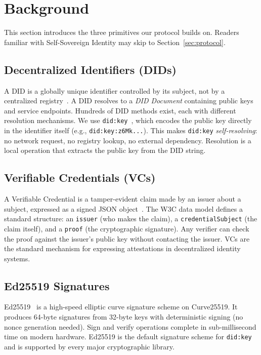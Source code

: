 \documentclass[11pt]{article}
\newcommand{\didkey}{\texttt{did:key}}
\newcommand{\vc}{Verifiable Credential}
\newcommand{\sref}[1]{Section~\ref{#1}}
\begin{document}
\section{Background}
\label{sec:background}

This section introduces the three primitives our protocol builds on. Readers familiar with Self-Sovereign Identity may skip to \sref{sec:protocol}.

\subsection{Decentralized Identifiers (DIDs)}

A DID is a globally unique identifier controlled by its subject, not by a centralized registry~\cite{w3cdid}. A DID resolves to a \emph{DID Document} containing public keys and service endpoints. Hundreds of DID methods exist, each with different resolution mechanisms. We use \didkey{}~\cite{didkey}, which encodes the public key directly in the identifier itself (e.g., \texttt{did:key:z6Mk...}). This makes \didkey{} \emph{self-resolving}: no network request, no registry lookup, no external dependency. Resolution is a local operation that extracts the public key from the DID string.

\subsection{Verifiable Credentials (VCs)}

A \vc{} is a tamper-evident claim made by an issuer about a subject, expressed as a signed JSON object~\cite{w3cvc}. The W3C data model defines a standard structure: an \texttt{issuer} (who makes the claim), a \texttt{credentialSubject} (the claim itself), and a \texttt{proof} (the cryptographic signature). Any verifier can check the proof against the issuer's public key without contacting the issuer. VCs are the standard mechanism for expressing attestations in decentralized identity systems.

\subsection{Ed25519 Signatures}

Ed25519~\cite{ed25519} is a high-speed elliptic curve signature scheme on Curve25519. It produces 64-byte signatures from 32-byte keys with deterministic signing (no nonce generation needed). Sign and verify operations complete in sub-millisecond time on modern hardware. Ed25519 is the default signature scheme for \didkey{} and is supported by every major cryptographic library.
\end{document}
